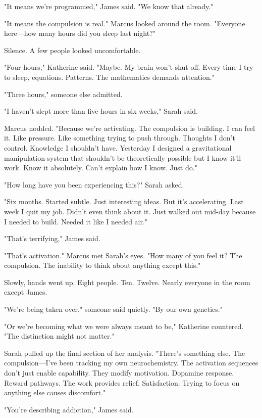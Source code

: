 "It means we're programmed," James said. "We know that already."

"It means the compulsion is real." Marcus looked around the room. "Everyone here—how many hours did you sleep last night?"

Silence. A few people looked uncomfortable.

"Four hours," Katherine said. "Maybe. My brain won't shut off. Every time I try to sleep, equations. Patterns. The mathematics demands attention."

"Three hours," someone else admitted.

"I haven't slept more than five hours in six weeks," Sarah said.

Marcus nodded. "Because we're activating. The compulsion is building. I can feel it. Like pressure. Like something trying to push through. Thoughts I don't control. Knowledge I shouldn't have. Yesterday I designed a gravitational manipulation system that shouldn't be theoretically possible but I know it'll work. Know it absolutely. Can't explain how I know. Just do."

"How long have you been experiencing this?" Sarah asked.

"Six months. Started subtle. Just interesting ideas. But it's accelerating. Last week I quit my job. Didn't even think about it. Just walked out mid-day because I needed to build. Needed it like I needed air."

"That's terrifying," James said.

"That's activation." Marcus met Sarah's eyes. "How many of you feel it? The compulsion. The inability to think about anything except this."

Slowly, hands went up. Eight people. Ten. Twelve. Nearly everyone in the room except James.

"We're being taken over," someone said quietly. "By our own genetics."

"Or we're becoming what we were always meant to be," Katherine countered. "The distinction might not matter."

Sarah pulled up the final section of her analysis. "There's something else. The compulsion—I've been tracking my own neurochemistry. The activation sequences don't just enable capability. They modify motivation. Dopamine response. Reward pathways. The work provides relief. Satisfaction. Trying to focus on anything else causes discomfort."

"You're describing addiction," James said.


